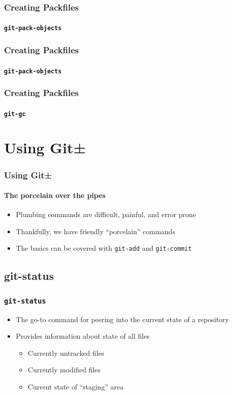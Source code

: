 \documentclass{beamer}
\begin{document}
\begin{frame}[fragile]
\frametitle{Creating Packfiles}
\framesubtitle{\texttt{git-pack-objects}}

\end{frame}

\begin{frame}[fragile]
\frametitle{Creating Packfiles}
\framesubtitle{\texttt{git-pack-objects}}

\end{frame}

\begin{frame}[fragile]
\frametitle{Creating Packfiles}
\framesubtitle{\texttt{git-gc}}

\end{frame}

\section{Using Git±}
\begin{frame}
\frametitle{Using Git±}
\framesubtitle{The porcelain over the pipes}
\begin{itemize}
\item{Plumbing commands are difficult, painful, and error prone}
\item{Thankfully, we have friendly ``porcelain'' commands}
\item{The basics can be covered with \texttt{git-add} and \texttt{git-commit}}
\end{itemize}
\end{frame}

\subsection{git-status}
\begin{frame}
\frametitle{\texttt{git-status}}
\begin{itemize}
\item{The go-to command for peering into the current state of a repository}
\item{Provides information about state of all files}
\begin{itemize}
\item{Currently untracked files}
\item{Currently modified files}
\item{Current state of ``staging'' area}
\end{itemize}
\end{itemize}
\end{frame}
\end{document}
